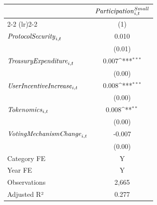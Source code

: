 {
\def\sym#1{\ifmmode^{#1}\else\(^{#1}\)\fi}
\begin{tabular}{l*{1}{c}}
\toprule
                    &\multicolumn{1}{c}{${\it Participation}^{Small}_{i,t}$}\\\cmidrule(lr){2-2}
\cmidrule(lr){2-2} & \multicolumn{1}{c}{(1)} \\ \midrule
${\it Protocol Security}_{i,t}$&       0.010         \\
                    &      (0.01)         \\
${\it Treasury Expenditure}_{i,t}$&       0.007\sym{***}\\
                    &      (0.00)         \\
${\it User Incentive Increase}_{i,t}$&       0.008\sym{***}\\
                    &      (0.00)         \\
${\it Tokenomics}_{i,t}$&       0.008\sym{**} \\
                    &      (0.00)         \\
${\it Voting Mechanism Change}_{i,t}$&      -0.007         \\
                    &      (0.00)         \\
\midrule
Category FE         &           Y         \\
Year FE             &           Y         \\
Observations        &       2,665         \\
Adjusted R²         &       0.277         \\
\bottomrule
\end{tabular}
}
